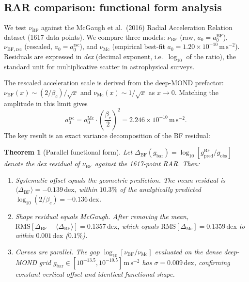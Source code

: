 \documentclass[12pt,a4paper]{article}
\theoremstyle{plain}
\newtheorem{theorem}{Theorem}[section]
\theoremstyle{definition}
\newcommand{\betac}{\beta_c}
\newcommand{\nuBF}{\nu_{\mathrm{BF}}}
\newcommand{\nuBFrsc}{\nu_{\mathrm{BF,rsc}}}
\newcommand{\nuMc}{\nu_{\mathrm{Mc}}}
\begin{document}
\subsection{RAR comparison: functional form analysis}
\label{subsec:rar}

We test $\nuBF$ against the McGaugh et al.\ (2016) Radial Acceleration
Relation dataset (1617 data points).  We compare three models:
$\nuBF$ (raw, $a_0 = a_0^{\mathrm{BF}}$),
$\nuBFrsc$ (rescaled, $a_0 = a_0^{\mathrm{rsc}}$), and
$\nuMc$ (empirical best-fit $a_0 = 1.20\times10^{-10}\,\mathrm{m\,s^{-2}}$).
Residuals are expressed in \emph{dex} (decimal exponent, i.e.\
$\log_{10}$ of the ratio), the standard unit for multiplicative
scatter in astrophysical surveys.

The rescaled acceleration scale is derived from the deep-MOND prefactor:
$\nuBF(x) \sim (2/\betac)/\sqrt{x}$ and $\nuMc(x) \sim 1/\sqrt{x}$ as
$x \to 0$.  Matching the amplitude in this limit gives
\begin{equation}
  a_0^{\mathrm{rsc}} = a_0^{\mathrm{Mc}} \cdot \left(\frac{\betac}{2}\right)^2
  = 2.246 \times 10^{-10}\,\mathrm{m\,s^{-2}}.
  \label{eq:a0rsc}
\end{equation}
The key result is an exact variance decomposition of the BF residual:

\begin{theorem}[Parallel functional form]
\label{thm:parallel}
  Let $\Delta_{\mathrm{BF}}(g_{\mathrm{bar}}) =
  \log_{10}[g_{\mathrm{pred}}^{\mathrm{BF}}/g_{\mathrm{obs}}]$
  denote the dex residual of $\nuBF$ against the 1617-point RAR.
  Then:
  \begin{enumerate}[label=(\alph*)]
    \item \emph{Systematic offset equals the geometric prediction.}
      The mean residual is $\langle\Delta_{\mathrm{BF}}\rangle = -0.139\,\mathrm{dex}$,
      within $10.3\%$ of the analytically predicted
      $\log_{10}(2/\betac) = -0.136\,\mathrm{dex}$.
    \item \emph{Shape residual equals McGaugh.}
      After removing the mean,
      $\mathrm{RMS}[\Delta_{\mathrm{BF}} - \langle\Delta_{\mathrm{BF}}\rangle]
      = 0.1357\,\mathrm{dex}$,
      which equals $\mathrm{RMS}[\Delta_{\mathrm{Mc}}] = 0.1359\,\mathrm{dex}$
      to within $0.001\,\mathrm{dex}$ ($0.1\%$).
    \item \emph{Curves are parallel.}
      The gap $\log_{10}[\nuBF/\nuMc]$ evaluated on the dense deep-MOND
      grid $g_{\mathrm{bar}} \in [10^{-13.5},10^{-10.5}]\,\mathrm{m\,s^{-2}}$
      has $\sigma = 0.009\,\mathrm{dex}$, confirming constant vertical
      offset and identical functional shape.
  \end{enumerate}
\end{theorem}
\end{document}
